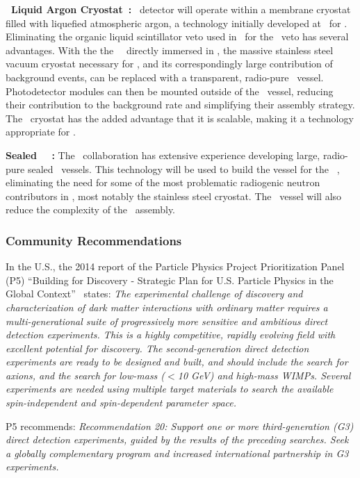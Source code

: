 {\bf \pDUNE\ Liquid Argon Cryostat~\cite{Abi:2017wp,Acciarri:2016wz}:}
\DSks\ detector will operate within a membrane cryostat filled with liquefied atmospheric argon, a technology initially developed at \CERN\ for \pDUNE. Eliminating the organic liquid scintillator veto used in \DSfs\ for the \AAr\ veto has several advantages. With the the \DSks\ \LArTPC\ directly immersed in \AAr, the massive stainless steel vacuum cryostat necessary for \DSfs, and its correspondingly large contribution of background events, can be replaced with a transparent, radio-pure \PMMA\ vessel. Photodetector modules can then be mounted outside of the \PMMA\ vessel, reducing their contribution to the background rate and simplifying their assembly strategy. The \pDUNE\ cryostat has the added advantage that it is scalable, making it a technology appropriate for \Argo.

{\bf Sealed \PMMA\ \TPC~\cite{Boulay:2012er,Nantais:2013jp,Amaudruz:2018gr}:}
The \DEAP\ collaboration has extensive experience developing large, radio-pure sealed \PMMA\ vessels. This technology will be used to build the vessel for the \DSks\ \LArTPC, eliminating the need for some of the most problematic radiogenic neutron contributors in \DSfs, most notably the stainless steel cryostat. The \PMMA\ vessel will also reduce the complexity of the \TPC\ assembly.

\subsubsection{Community Recommendations}

In the U.S., the 2014 report of the Particle Physics Project Prioritization Panel (P5) ``Building for Discovery - Strategic Plan for U.S. Particle Physics in the Global Context''~\cite{ParticlePhysicsProjectPrioritizationPanel:2014td} states: {\it The experimental challenge of discovery and characterization of dark matter interactions with ordinary matter requires a multi-generational suite of progressively more sensitive and ambitious direct detection experiments.  This is a highly competitive, rapidly evolving field with excellent potential for discovery.  The second-generation direct detection experiments are ready to be designed and built, and should include the search for axions, and the search for low-mass ($<$10 GeV) and high-mass WIMPs.  Several experiments are needed using multiple target materials to search the available spin-independent and spin-dependent parameter space. }

P5 recommends: {\it Recommendation 20: Support one or more third-generation (G3) direct detection experiments, guided by the results of the preceding searches.  Seek a globally complementary program and increased international partnership in G3 experiments.}

